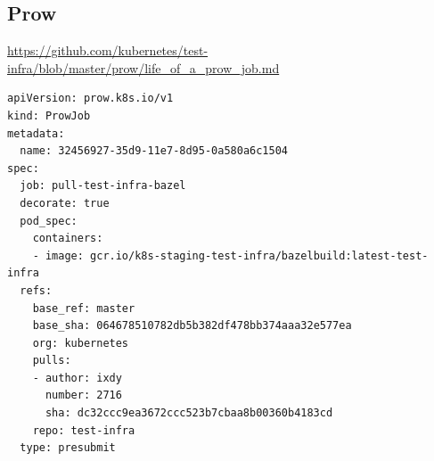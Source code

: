 \subsection{Prow}

\begin{frame}[fragile]
    \autotitle
    \footnotesize
    \url{https://github.com/kubernetes/test-infra/blob/master/prow/life_of_a_prow_job.md}
    \scriptsize
    \begin{verbatim}
apiVersion: prow.k8s.io/v1
kind: ProwJob
metadata:
  name: 32456927-35d9-11e7-8d95-0a580a6c1504
spec:
  job: pull-test-infra-bazel
  decorate: true
  pod_spec:
    containers:
    - image: gcr.io/k8s-staging-test-infra/bazelbuild:latest-test-infra
  refs:
    base_ref: master
    base_sha: 064678510782db5b382df478bb374aaa32e577ea
    org: kubernetes
    pulls:
    - author: ixdy
      number: 2716
      sha: dc32ccc9ea3672ccc523b7cbaa8b00360b4183cd
    repo: test-infra
  type: presubmit
    \end{verbatim}
\end{frame}

